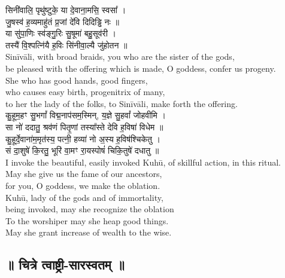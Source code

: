 \documentclass[11pt]{article}
\begin{document}
\begin{adjustwidth}{6em}{.2em}
{\large\skts\color{deepblue}
सिनी॑वालि॒ पृथु॑ष्टुके॒ या दे॒वाना॒मसि॒ स्वसा᳚ ।\\
जु॒षस्व॑ ह॒व्यमाहु॑तं प्र॒जां दे॑वि दिदिड्ढि नः ॥\\
या सु॑पा॒णिः स्व॑ङ्गु॒रिः सु॒षूमा॑ बहु॒सूव॑री ।\\
तस्यै॑ वि॒श्पत्नि॑यै ह॒विः सि॑नीवा॒ल्यै जु॑होतन ॥}\\[5pt]
Sinīvāli, with broad braids, you who are the sister of the gods,\\
be pleased with the offering which is made, O goddess, confer us progeny.\\
She who has good hands, good fingers,\\ 
who causes easy birth, progenitrix of many,\\
to her the lady of the folks, to Sinīvāli, make forth the offering.\\[10pt]

{\large\skts\color{deepblue}
कु॒हूम॒हꣳ सु॒भगां᳚ विद्म॒नाप॑सम॒स्मिन्, य॒ज्ञे सु॒हवां᳚ जोहवीमि ।\\
सा नो॑ ददातु॒ श्रव॑णं पितृ॒णां तस्या᳚स्ते देवि ह॒विषा॑ विधेम ॥\\
कु॒हूर्दे॒वाना॑म॒मृत॑स्य॒ पत्नी॒ हव्या॑ नो अ॒स्य ह॒विष॑श्चिकेतु ।\\
सं दा॒शुषे॑ कि॒रतु॒ भूरि॑ वा॒मꣳ रा॒यस्पोषं॑ चिकि॒तुषे॑ दधातु ॥}\\[5pt]
I invoke the beautiful, easily invoked Kuhū, of skillful action, in this ritual.\\
May she give us the fame of our ancestors,\\
for you, O goddess, we make the oblation.\\
Kuhū, lady of the gods and of immortality,\\
being invoked, may she recognize the oblation\\
To the worshiper may she heap good things.\\
May she grant increase of wealth to the wise.\\
\end{adjustwidth}
\newpage
\begin{center}
	\section{{\Large\skts ॥ चित्रे त्वाष्ट्री-सारस्वतम् ॥}}
\end{center}
\end{document}
